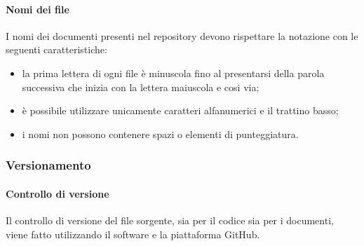   \paragraph{Nomi dei file}
  I nomi dei documenti presenti nel repository devono rispettare la notazione  con le seguenti caratteristiche:
  \begin{itemize}
  	\item la prima lettera di ogni file è minuscola fino al presentarsi della parola successiva che inizia con la lettera maiuscola e cosi via;
  	\item è possibile utilizzare unicamente caratteri alfanumerici e il trattino basso;
  	\item i nomi non possono contenere spazi o elementi di punteggiatura.
  \end{itemize}

  \subsubsection{Versionamento}\label{sec:versionamento}
	  \paragraph{Controllo di versione}
	  Il controllo di versione del file sorgente, sia per il codice sia per i documenti, viene fatto utilizzando il software  e la piattaforma GitHub. 
